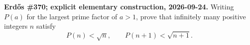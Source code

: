 \textbf{Erd\H{o}s \#370; explicit elementary construction, 2026-09-24.}
Writing $P(a)$ for the largest prime factor of $a>1$, prove that infinitely many positive integers $n$ satisfy
\[
P(n)<\sqrt n,\qquad P(n+1)<\sqrt{n+1}.
\]
